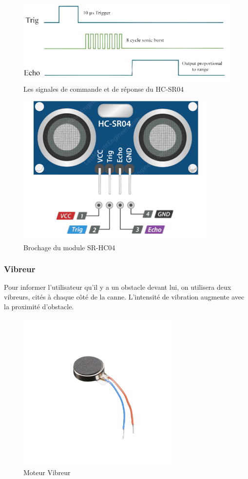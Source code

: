 \begin{figure}[hbt!]
    \centering
    \includegraphics[width=14cm]{assets/HC-SR04/principe.png}
    \caption{Les signales de commande et de réponse du HC-SR04}
\end{figure}

\begin{figure}[!htbp]
    \centering
    \includegraphics[width=10cm]{assets/HC-SR04/pinout.png}
    \caption{Brochage du module SR-HC04}
\end{figure}

\FloatBarrier

\subsubsection{Vibreur}

Pour informer l'utilisateur qu'il y a un obstacle devant lui, on utilisera deux vibreurs, cités à chaque côté de la canne. L'intensité de vibration augmente avec la proximité d'obstacle.

\begin{figure}[!htbp]
    \centering
    \includegraphics[width=8cm]{assets/vibrator.png}
    \caption{Moteur Vibreur}
\end{figure}

